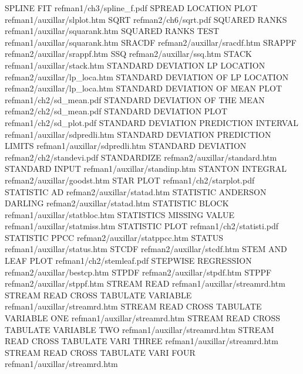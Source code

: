 SPLINE FIT                              refman1/ch3/spline_f.pdf
SPREAD LOCATION PLOT                    refman1/auxillar/slplot.htm
SQRT                                    refman2/ch6/sqrt.pdf
SQUARED RANKS                           refman1/auxillar/squarank.htm
SQUARED RANKS TEST                      refman1/auxillar/squarank.htm
SRACDF                                  refman2/auxillar/sracdf.htm
SRAPPF                                  refman2/auxillar/srappf.htm
SSQ                                     refman2/auxillar/ssq.htm
STACK                                   refman1/auxillar/stack.htm
STANDARD DEVIATION LP LOCATION          refman2/auxillar/lp_loca.htm
STANDARD DEVIATION OF LP LOCATION       refman2/auxillar/lp_loca.htm
STANDARD DEVIATION OF MEAN PLOT         refman1/ch2/sd_mean.pdf
STANDARD DEVIATION OF THE MEAN          refman2/ch2/sd_mean.pdf
STANDARD DEVIATION PLOT                 refman1/ch2/sd_plot.pdf
STANDARD DEVIATION PREDICTION INTERVAL  refman1/auxillar/sdpredli.htm
STANDARD DEVIATION PREDICTION LIMITS    refman1/auxillar/sdpredli.htm
STANDARD DEVIATION                      refman2/ch2/standevi.pdf
STANDARDIZE                             refman2/auxillar/standard.htm
STANDARD INPUT                          refman1/auxillar/standinp.htm
STANTON INTEGRAL                        refman2/auxillar/goodst.htm
STAR PLOT                               refman1/ch2/starplot.pdf
STATISTIC AD                            refman2/auxillar/statad.htm
STATISTIC ANDERSON DARLING              refman2/auxillar/statad.htm
STATISTIC BLOCK                         refman1/auxillar/statbloc.htm
STATISTICS MISSING VALUE                refman1/auxillar/statmiss.htm
STATISTIC PLOT                          refman1/ch2/statisti.pdf
STATISTIC PPCC                          refman2/auxillar/statppcc.htm
STATUS                                  refman1/auxillar/status.htm
STCDF                                   refman2/auxillar/stcdf.htm
STEM AND LEAF PLOT                      refman1/ch2/stemleaf.pdf
STEPWISE REGRESSION                     refman2/auxillar/bestcp.htm
STPDF                                   refman2/auxillar/stpdf.htm
STPPF                                   refman2/auxillar/stppf.htm
STREAM READ                             refman1/auxillar/streamrd.htm
STREAM READ CROSS TABULATE VARIABLE     refman1/auxillar/streamrd.htm
STREAM READ CROSS TABULATE VARIABLE ONE refman1/auxillar/streamrd.htm
STREAM READ CROSS TABULATE VARIABLE TWO refman1/auxillar/streamrd.htm
STREAM READ CROSS TABULATE VARI THREE   refman1/auxillar/streamrd.htm
STREAM READ CROSS TABULATE VARI FOUR    refman1/auxillar/streamrd.htm
